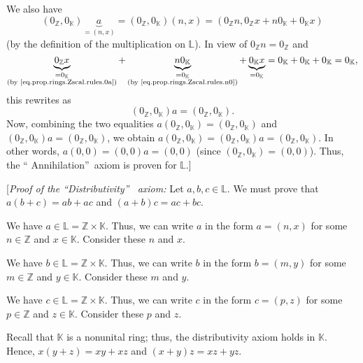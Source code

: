 \documentclass[paper=a4, fontsize=12pt]{scrartcl}%
\theoremstyle{plainsl}
\theoremstyle{definition}
\theoremstyle{remark}
\begin{document}
We also have%
\[
\left(  0_{\mathbb{Z}},0_{\mathbb{K}}\right)  \underbrace{a}_{=\left(
n,x\right)  }=\left(  0_{\mathbb{Z}},0_{\mathbb{K}}\right)  \left(
n,x\right)  =\left(  0_{\mathbb{Z}}n,0_{\mathbb{Z}}x+n0_{\mathbb{K}%
}+0_{\mathbb{K}}x\right)
\]
(by the definition of the multiplication on $\mathbb{L}$). In view of
$0_{\mathbb{Z}}n=0_{\mathbb{Z}}$ and
\[
\underbrace{0_{\mathbb{Z}}x}_{\substack{=0_{\mathbb{K}}\\\text{(by
\eqref{eq.prop.rings.Zscal.rules.0a})}}}+\underbrace{n0_{\mathbb{K}}%
}_{\substack{=0_{\mathbb{K}}\\\text{(by \eqref{eq.prop.rings.Zscal.rules.n0})}%
}}+\underbrace{0_{\mathbb{K}}x}_{=0_{\mathbb{K}}}=0_{\mathbb{K}}%
+0_{\mathbb{K}}+0_{\mathbb{K}}=0_{\mathbb{K}},
\]
this rewrites as
\[
\left(  0_{\mathbb{Z}},0_{\mathbb{K}}\right)  a=\left(  0_{\mathbb{Z}%
},0_{\mathbb{K}}\right)  .
\]
Now, combining the two equalities $a\left(  0_{\mathbb{Z}},0_{\mathbb{K}%
}\right)  =\left(  0_{\mathbb{Z}},0_{\mathbb{K}}\right)  $ and $\left(
0_{\mathbb{Z}},0_{\mathbb{K}}\right)  a=\left(  0_{\mathbb{Z}},0_{\mathbb{K}%
}\right)  $, we obtain $a\left(  0_{\mathbb{Z}},0_{\mathbb{K}}\right)
=\left(  0_{\mathbb{Z}},0_{\mathbb{K}}\right)  a=\left(  0_{\mathbb{Z}%
},0_{\mathbb{K}}\right)  $. In other words, $a\left(  0,0\right)  =\left(
0,0\right)  a=\left(  0,0\right)  $ (since $\left(  0_{\mathbb{Z}%
},0_{\mathbb{K}}\right)  =\left(  0,0\right)  $). Thus, the \textquotedblleft
Annihilation\textquotedblright\ axiom is proven for $\mathbb{L}$.]

[\textit{Proof of the \textquotedblleft Distributivity\textquotedblright%
\ axiom:} Let $a,b,c\in\mathbb{L}$. We must prove that $a\left(  b+c\right)
=ab+ac$ and $\left(  a+b\right)  c=ac+bc$.

We have $a\in\mathbb{L}=\mathbb{Z}\times\mathbb{K}$. Thus, we can write $a$ in
the form $a=\left(  n,x\right)  $ for some $n\in\mathbb{Z}$ and $x\in
\mathbb{K}$. Consider these $n$ and $x$.

We have $b\in\mathbb{L}=\mathbb{Z}\times\mathbb{K}$. Thus, we can write $b$ in
the form $b=\left(  m,y\right)  $ for some $m\in\mathbb{Z}$ and $y\in
\mathbb{K}$. Consider these $m$ and $y$.

We have $c\in\mathbb{L}=\mathbb{Z}\times\mathbb{K}$. Thus, we can write $c$ in
the form $c=\left(  p,z\right)  $ for some $p\in\mathbb{Z}$ and $z\in
\mathbb{K}$. Consider these $p$ and $z$.

Recall that $\mathbb{K}$ is a nonunital ring; thus, the distributivity axiom
holds in $\mathbb{K}$. Hence, $x\left(  y+z\right)  =xy+xz$ and $\left(
x+y\right)  z=xz+yz$.
\end{document}
